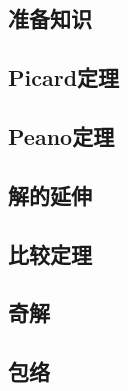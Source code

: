 \documentclass[12pt,a4paper]{article}
\begin{document}
\subsection{准备知识}
\subsection{Picard定理}
\subsection{Peano定理}
\subsection{解的延伸}
\subsection{比较定理}
\subsection{奇解}
\subsection{包络}
\end{document}
